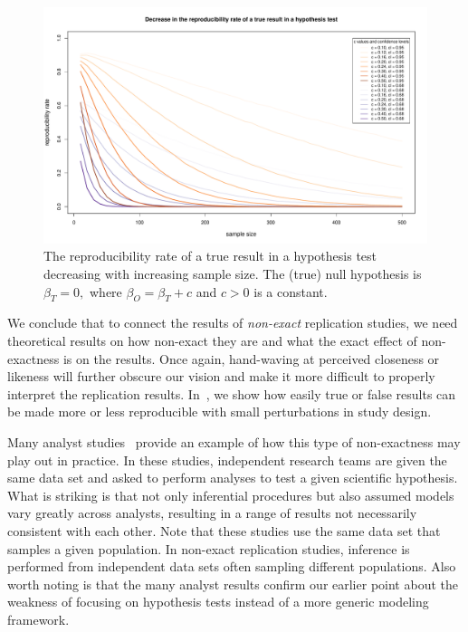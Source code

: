 \documentclass[meta,authordate]{jote-new-article}
\newcounter{result}
\begin{document}
\begin{figure}[b]
  \begin{fullwidth}
    \centering
    \includegraphics[width=\textwidth]{Figure_1.pdf}
    \caption{The reproducibility rate of a true result in a hypothesis test decreasing with increasing sample size. The (true) null hypothesis is $\beta_{T}=0,$ where $\beta_{O}=\beta_{T}+c$ and $c>0$  is a constant.}
    \label{fig:samplesize}
  \end{fullwidth}
\end{figure}


We conclude that to connect the results of {\em non-exact} replication studies, we need theoretical results on how non-exact they are and what the exact effect of non-exactness is on the results. Once again, hand-waving at perceived closeness or likeness will further obscure our vision and make it more difficult to properly interpret the replication results. In~\textcite{Buzbas2023}, we show how easily true or false results can be made more or less reproducible with small perturbations in study design.

Many analyst studies~\parencites[e.g.,][]{breznau2022observing}{hoogeveen2022many}{Silberzahn2018} provide an example of how this type of non-exactness may play out in practice. In these studies, independent research teams are given the same data set and asked to perform analyses to test a given scientific hypothesis. What is striking is that not only inferential procedures but also assumed models vary greatly across analysts, resulting in a range of results not necessarily consistent with each other. Note that these studies use the same data set that samples a given population. In non-exact replication studies, inference is performed from independent data sets often sampling different populations. Also worth noting is that the many analyst results confirm our earlier point about the weakness of focusing on hypothesis tests instead of a more generic modeling framework.
\end{document}
